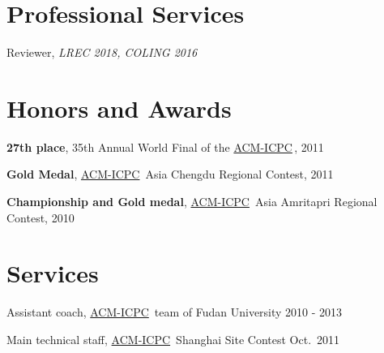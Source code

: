 \documentclass[line,margin]{cv}
\newcommand{\myemph}{\textbf}
\newcommand{\ICPC}{\href{http://icpc.baylor.edu/}{ACM-ICPC}}
\begin{document}
\begin{resume}
\section{Professional Services }
	Reviewer, \emph{LREC 2018, COLING 2016}

\section{Honors and Awards}
	\myemph{27th place}, 35th Annual World Final of the \ICPC \,, 2011

	\myemph{Gold Medal}, \ICPC\ Asia Chengdu Regional Contest, 2011

	\myemph{Championship and Gold medal}, \ICPC\ Asia Amritapri Regional Contest, 2010

\section{Services}
    Assistant coach, \ICPC\ team of Fudan University \hfill 2010 - 2013

    Main technical staff, \ICPC\ Shanghai Site Contest \hfill Oct.\ 2011

\end{resume}
\end{document}
